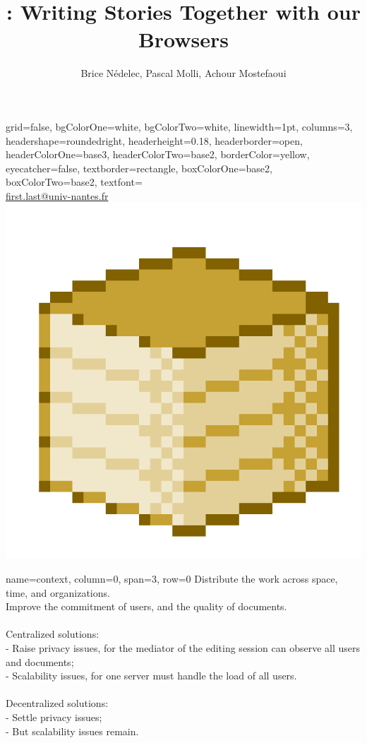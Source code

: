 \documentclass[a1paper, fontscale=0.35, portrait]{baposter}
\title{\CRATE: Writing Stories Together with our Browsers}
\author{Brice Nédelec, Pascal Molli, Achour Mostefaoui}
\begin{document}
\begin{poster}{
    grid=false,
    bgColorOne=white,
    bgColorTwo=white,
    linewidth=1pt,
    columns=3,
    headershape=roundedright, 
    headerheight=0.18\textheight,
    headerborder=open,
    headerColorOne=base3,
    headerColorTwo=base2,
    borderColor=yellow,
    eyecatcher=false,
    textborder=rectangle,
    boxColorOne=base2,
    boxColorTwo=base2,
    textfont=\sffamily
  }
  {}
  {\huge\textsc{\thetitle}\vspace{0.4em}}
  {\theauthor \\ \url{first.last@univ-nantes.fr}}
  {\includegraphics[height=0.16\textheight, interpolate=false]{logos/crateicon.png}}

  {name=context, column=0, span=3, row=0} {
    Distribute the work across space, time, and organizations.\\
    Improve the commitment of users, and the quality of documents.\\
    \\
    Centralized solutions: \\
    - Raise privacy issues, for the mediator of the editing session can
      observe all users and documents; \\
    - Scalability issues, for one server must handle the load of all users. \\
    \\
    Decentralized solutions: \\
    - Settle privacy issues; \\
    - But scalability issues remain.
  }


\end{poster}
\end{document}
